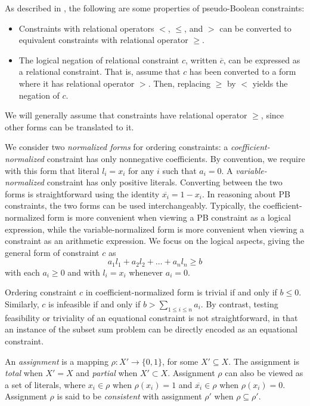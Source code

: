 \documentclass{fmcad}
\begin{document}
As described in \cite{gocht_phd_2022}, the following are some properties of pseudo-Boolean
constraints:
\begin{itemize}
\item Constraints with relational operators $<$, $\leq$, and $>$ can be converted to equivalent
  constraints with relational operator $\geq$.
\item The logical negation of relational constraint $c$, written $\overline{c}$, can be expressed
  as a relational constraint. That is, assume that $c$ has been converted to a form where it has
  relational operator $>$. Then, replacing $\geq$ by $<$ yields the negation of $c$.
\end{itemize}

We will generally assume that constraints have relational operator $\geq$, since other forms can
be translated to it.

We consider two \textit{normalized forms} for ordering constraints: a \textit{coefficient-normalized}
constraint has only nonnegative coefficients. By convention, we require with this form that literal
$l_i = x_i$ for any $i$ such that $a_i = 0$. A \textit{variable-normalized} constraint has only
positive literals. Converting between the two forms is straightforward using the identity
$\overline{x_i} = 1 - x_i$. In reasoning about PB constraints, the two forms can be used
interchangeably. Typically, the coefficient-normalized form is more convenient when viewing a PB
constraint as a logical expression, while the variable-normalized form is more convenient when
viewing a constraint as an arithmetic expression. We focus on the logical aspects, giving
the general form of constraint $c$ as
\begin{equation}
  \label{eq:gen-constraint}
  a_1 l_1 + a_2 l_2 + \dots + a_n l_n \geq b
\end{equation}
with each $a_i \geq 0$ and with $l_i = x_i$ whenever $a_i = 0$.

Ordering constraint $c$ in coefficient-normalized form is trivial if and only if $b \leq 0$.
Similarly, $c$ is infeasible if and only if $b > \sum_{1 \leq i \leq n} a_i$. By contrast, testing
feasibility or triviality of an equational constraint is not straightforward, in that an instance
of the subset sum problem \cite{garey1972optimal} can be directly encoded as an equational constraint.

An \textit{assignment} is a mapping $\rho : X' \rightarrow \{0, 1\}$, for some $X' \subseteq X$.
The assignment is \textit{total} when $X' = X$ and \textit{partial} when $X' \subset X$. Assignment
$\rho$ can also be viewed as a set of literals, where $x_i \in \rho$ when $\rho(x_i) = 1$ and
$\overline{x_i} \in \rho$ when $\rho(x_i) = 0$. Assignment $\rho$ is said to be \textit{consistent}
with assignment $\rho'$ when $\rho \subseteq \rho'$.
\end{document}
